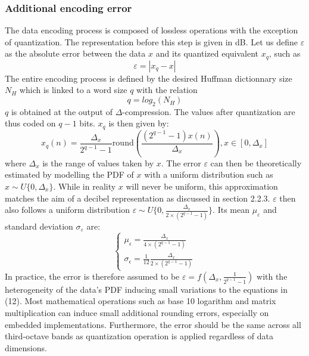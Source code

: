 \documentclass[12pt,times,onecolumn]{article}
\begin{document}
\subsubsection{Additional encoding error}
The data encoding process is composed of lossless operations with the exception of quantization. The representation before this step is given in dB. Let us define $\varepsilon$ as the absolute error between the data $x$ and its quantized equivalent $x_q$, such as
\begin{equation}
\varepsilon = |x_q-x|
\end{equation}
The entire encoding process is defined by the desired Huffman dictionnary size $N_H$ which is linked to a word size $q$ with the relation
\begin{equation}
q = log_2(N_H)
\end{equation}
$q$ is obtained at the output of $\Delta$-compression. The values after quantization are thus coded on $q-1$ bits. $x_q$ is then given by:
\begin{equation}
x_q(n) = \frac{\Delta_x}{2^{q-1}-1}\textrm{round}\left(\frac{(2^{q-1}-1)x(n)}{\Delta_x}\right), x\in \left[0, \Delta_x\right]
\end{equation}
where $\Delta_x$ is the range of values taken by $x$. The error $\varepsilon$ can then be theoretically estimated by modelling the PDF of $x$ with a uniform distribution such as $x\sim \textit{U}\{0, \Delta_x\}$. While in reality $x$ will never be uniform, this approximation matches the aim of a decibel representation as discussed in section 2.2.3. $\varepsilon$ then also follows a uniform distribution $\varepsilon\sim U\{0, \frac{\Delta_x}{2\times (2^{q-1}-1)}\}$. Its mean $\mu_\varepsilon$ and standard deviation $\sigma_\varepsilon$ are:
\begin{equation}
\begin{cases}
	\mu_\epsilon = \frac{\Delta_x}{4\times (2^{q-1}-1)}\\
	\sigma_\epsilon = \frac{1}{12}\frac{\Delta_x}{2\times (2^{q-1}-1)}
\end{cases}
\end{equation}
In practice, the error is therefore assumed to be $\varepsilon = f(\Delta_x, \frac{1}{2^{q-1}-1})$ with the heterogeneity of the data's PDF inducing small variations to the equations in (12). Most mathematical operations such as base 10 logarithm and matrix multiplication can induce small additional rounding errors, especially on embedded implementations. Furthermore, the error should be the same across all third-octave bands as quantization operation is applied regardless of data dimensions.\\
\end{document}
